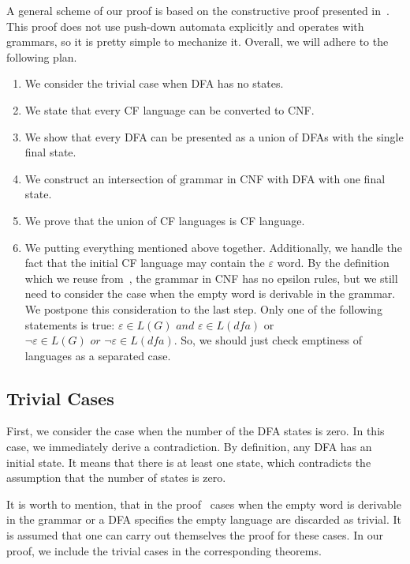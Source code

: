 A general scheme of our proof is based on the constructive proof presented in~\cite{beigelproof}.
This proof does not use push-down automata explicitly and operates with grammars, so it is pretty simple to mechanize it.
Overall, we will adhere to the following plan.

\begin{enumerate}
    \item We consider the trivial case when DFA has no states.
    \item We state that every CF language can be converted to CNF.
    \item We show that every DFA can be presented as a union of DFAs with the single final state.
    \item We construct an intersection of grammar in CNF with DFA with one final state.
    \item We prove that the union of CF languages is CF language.
    \item We putting everything mentioned above together.
	Additionally, we handle the fact that the initial CF language may contain the $\varepsilon$ word. By the definition which we reuse from~\cite{smolkaHofmann2016}, the grammar in CNF has no epsilon rules, but we still need to consider the case when the empty word is derivable in the grammar. We postpone this consideration to the last step. Only one of the following statements is true: $\varepsilon \in L(G) \textit{ and } \varepsilon \in L(\textit{dfa})$ or $\neg \varepsilon \in L(G) \textit{ or } \neg \varepsilon \in L(\textit{dfa})$. So, we should just check emptiness of languages as a separated case.

\end{enumerate}


\subsection{Trivial Cases}

First, we consider the case when the number of the DFA states is zero.
In this case, we immediately derive a contradiction.
By definition, any DFA has an initial state.
It means that there is at least one state, which contradicts the assumption that the number of states is zero.

It is worth to mention, that in the proof~\cite{beigelproof} cases when the empty word is derivable in the grammar or a DFA specifies the empty language are discarded as trivial.
It is assumed that one can carry out themselves the proof for these cases.
In our proof, we include the trivial cases in the corresponding theorems.

